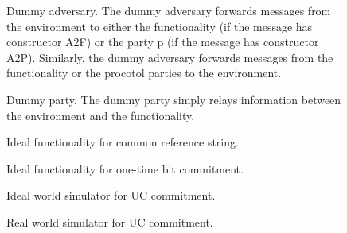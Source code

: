 \begin{figure}

\caption{Dummy adversary. The dummy adversary forwards messages from the
environment to either the functionality (if the message has
constructor \textsf{A2F}) or the party \textsf{p} (if the message has
constructor \textsf{A2P}). Similarly, the dummy adversary forwards messages from
the functionality or the procotol parties to the environment.}
\label{fig:dummy-adversary}
\end{figure}

\begin{figure}

\caption{Dummy party. The dummy party simply relays information between the
environment and the functionality.}
\label{fig:dummy-party}
\end{figure}

\begin{figure}

\caption{Ideal functionality for common reference string.}
\label{fig:f-crs}
\end{figure}

\begin{figure}

\caption{Ideal functionality for one-time bit commitment.}
\label{fig:f-com-full}
\end{figure}

\begin{figure}

\caption{Ideal world simulator for UC commitment.}
\label{fig:sim}
\end{figure}

\begin{figure}

\caption{Real world simulator for UC commitment.}
\label{fig:simR}
\end{figure}

